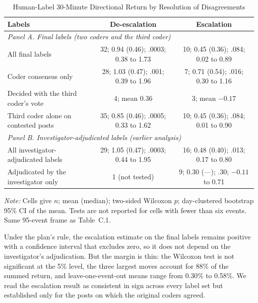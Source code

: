 \documentclass[11pt]{article}
\begin{document}
\begin{table}[h]
\centering
\small
\caption{Human-Label 30-Minute Directional Return by Resolution of Disagreements}
\label{tab:adjudication}
\begin{tabular}{lcc}
\toprule
Labels & De-escalation & Escalation \\
\midrule
\multicolumn{3}{l}{\textit{Panel A. Final labels (two coders and the third coder)}} \\
All final labels & 32; 0.94 (0.46); .0003; 0.38 to 1.73 & 10; 0.45 (0.36); .084; 0.02 to 0.89 \\
Coder consensus only & 28; 1.03 (0.47); .001; 0.39 to 1.96 & 7; 0.71 (0.54); .016; 0.30 to 1.16 \\
Decided with the third coder's vote & 4; mean 0.36 & 3; mean $-0.17$ \\
Third coder alone on contested posts & 35; 0.85 (0.46); .0005; 0.33 to 1.62 & 10; 0.45 (0.36); .084; 0.01 to 0.90 \\
\midrule
\multicolumn{3}{l}{\textit{Panel B. Investigator-adjudicated labels (earlier analysis)}} \\
All investigator-adjudicated labels & 29; 1.05 (0.47); .0003; 0.44 to 1.95 & 16; 0.48 (0.40); .013; 0.17 to 0.80 \\
Adjudicated by the investigator only & 1 (not tested) & 9; 0.30 (---); .30; $-0.11$ to 0.71 \\
\bottomrule
\end{tabular}

\vspace{0.5em}
\begin{minipage}{0.95\textwidth}
\footnotesize\textit{Note:} Cells give $n$; mean (median); two-sided Wilcoxon $p$; day-clustered bootstrap 95\% CI of the mean. Tests are not reported for cells with fewer than six events. Same 95-event frame as Table~C.1.
\end{minipage}
\end{table}

\noindent Under the plan's rule, the escalation estimate on the final labels remains positive with a confidence interval that excludes zero, so it does not depend on the investigator's adjudication. But the margin is thin: the Wilcoxon test is not significant at the 5\% level, the three largest moves account for 88\% of the summed return, and leave-one-event-out means range from 0.30\% to 0.58\%. We read the escalation result as consistent in sign across every label set but established only for the posts on which the original coders agreed.
\end{document}
